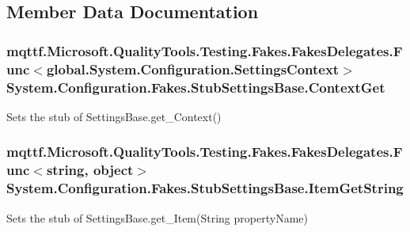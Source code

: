 \subsection{Member Data Documentation}
\hypertarget{class_system_1_1_configuration_1_1_fakes_1_1_stub_settings_base_acf04addfca8a7888cb8f65ae8486521d}{
\subsubsection[{Context\-Get}]{\setlength{\rightskip}{0pt plus 5cm}mqttf.\-Microsoft.\-Quality\-Tools.\-Testing.\-Fakes.\-Fakes\-Delegates.\-Func$<$global.\-System.\-Configuration.\-Settings\-Context$>$ System.\-Configuration.\-Fakes.\-Stub\-Settings\-Base.\-Context\-Get}}\label{class_system_1_1_configuration_1_1_fakes_1_1_stub_settings_base_acf04addfca8a7888cb8f65ae8486521d}


Sets the stub of Settings\-Base.\-get\-\_\-\-Context()

\hypertarget{class_system_1_1_configuration_1_1_fakes_1_1_stub_settings_base_a256f7fd4bfc4f1af267dcdf79cdf65a1}{
\subsubsection[{Item\-Get\-String}]{\setlength{\rightskip}{0pt plus 5cm}mqttf.\-Microsoft.\-Quality\-Tools.\-Testing.\-Fakes.\-Fakes\-Delegates.\-Func$<$string, object$>$ System.\-Configuration.\-Fakes.\-Stub\-Settings\-Base.\-Item\-Get\-String}}\label{class_system_1_1_configuration_1_1_fakes_1_1_stub_settings_base_a256f7fd4bfc4f1af267dcdf79cdf65a1}


Sets the stub of Settings\-Base.\-get\-\_\-\-Item(\-String property\-Name)

